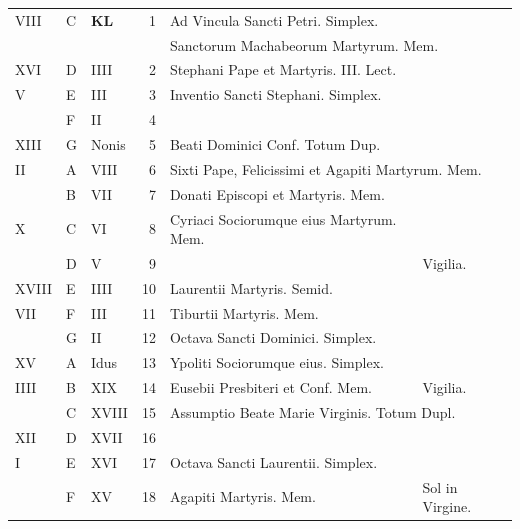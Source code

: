 \documentclass[11pt,openany]{book}
\begin{document}
\begin{center}
\begin{tabular}{l | l | l | r | l l}
\color{Red} VIII & C & \textbf{\color{Red} K\color{Blue}L} & 1 & Ad Vincula Sancti Petri. Simplex. & \color{Red} \\
 &  & &  & \multicolumn{2}{l}{\qquad Sanctorum Machabeorum Martyrum. Mem. \color{Red}} \\
\color{Red} XVI & D & \color{Red} IIII & 2 & \color{Red} Stephani Pape et Martyris. III. Lect. \\
\color{Red} V & E & \color{Red} III & 3 & \color{Red} Inventio Sancti Stephani. Simplex. \\
\color{Red}  & F & \color{Red} II & 4 & & \color{Red} \\
\color{Red} XIII & G & \color{Red} Nonis & 5 & Beati Dominici Conf. Totum Dup. & \color{Red} \\
\color{Red} II & \color{Red} A & \color{Red} VIII & 6 & \multicolumn{2}{l}{Sixti Pape, Felicissimi et Agapiti Martyrum. Mem.} \color{Red} \\
\color{Red}  & B & \color{Red} VII & 7 & Donati Episcopi et Martyris. Mem. & \color{Red} \\
\color{Red} X & C & \color{Red} VI & 8 & Cyriaci Sociorumque eius Martyrum. Mem. & \color{Red} \\
\color{Red}  & D & \color{Red} V & 9 & & \color{Red} Vigilia. \\
\color{Red} XVIII & E & \color{Red} IIII & 10 & \color{Red} Laurentii Martyris. Semid. & \color{Red} \\
\color{Red} VII & F & \color{Red} III & 11 & Tiburtii Martyris. Mem. & \color{Red} \\
\color{Red}  & G & \color{Red} II & 12 & Octava Sancti Dominici. Simplex. & \color{Red} \\
\color{Red} XV & \color{Red} A & \color{Red} Idus & 13 & Ypoliti Sociorumque eius. Simplex. & \color{Red} \\
\color{Red} IIII & B & \color{Red} XIX & 14 & Eusebii Presbiteri et Conf. Mem. & \color{Red} Vigilia. \\
\color{Red}  & C & \color{Red} XVIII & 15 & \multicolumn{2}{l}{\color{Red} Assumptio Beate Marie Virginis. Totum Dupl.} \color{Red} \\
\color{Red} XII & D & \color{Red} XVII & 16 & & \color{Red} \\
\color{Red} I & E & \color{Red} XVI & 17 & Octava Sancti Laurentii. Simplex. & \color{Red} \\
\color{Red}  & F & \color{Red} XV & 18 & Agapiti Martyris. Mem. & \color{Red} Sol in Virgine. \\

\end{tabular}
\end{center}
\end{document}

